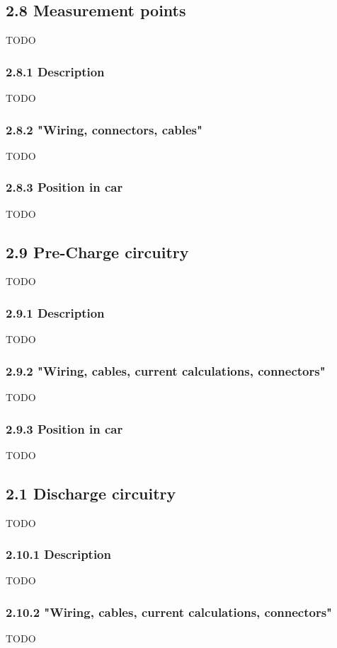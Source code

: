 \documentclass{article}
\begin{document}
\subsection*{2.8 Measurement points}
TODO

\subsubsection*{2.8.1 Description}
TODO

\subsubsection*{2.8.2 "Wiring, connectors, cables"}
TODO

\subsubsection*{2.8.3 Position in car}
TODO

\subsection*{2.9 Pre-Charge circuitry}
TODO

\subsubsection*{2.9.1 Description}
TODO

\subsubsection*{2.9.2 "Wiring, cables, current calculations, connectors"}
TODO

\subsubsection*{2.9.3 Position in car}
TODO

\subsection*{2.1 Discharge circuitry}
TODO

\subsubsection*{2.10.1 Description}
TODO

\subsubsection*{2.10.2 "Wiring, cables, current calculations, connectors"}
TODO
\end{document}
